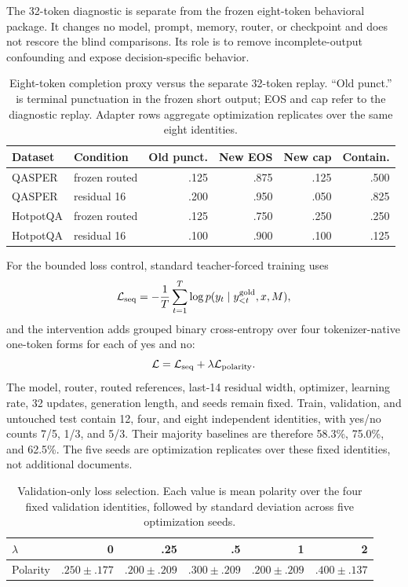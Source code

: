 \documentclass[11pt]{article}
\begin{document}
The 32-token diagnostic is separate from the frozen eight-token behavioral package. It changes no
model, prompt, memory, router, or checkpoint and does not rescore the blind comparisons. Its role is
to remove incomplete-output confounding and expose decision-specific behavior.

\begin{table}[H]
\centering
\small
\caption{Eight-token completion proxy versus the separate 32-token replay. ``Old punct.'' is
terminal punctuation in the frozen short output; EOS and cap refer to the diagnostic replay.
Adapter rows aggregate optimization replicates over the same eight identities.}
\label{tab:qasper-finish-diagnostic}
\begin{tabular}{llrrrr}
\toprule
Dataset & Condition & Old punct. & New EOS & New cap & Contain. \\
\midrule
QASPER & frozen routed & .125 & .875 & .125 & .500 \\
QASPER & residual 16 & .200 & .950 & .050 & .825 \\
HotpotQA & frozen routed & .125 & .750 & .250 & .250 \\
HotpotQA & residual 16 & .100 & .900 & .100 & .125 \\
\bottomrule
\end{tabular}
\end{table}

For the bounded loss control, standard teacher-forced training uses
\begin{equation}
  \mathcal{L}_{\rm seq}
  = -\frac{1}{T}\sum_{t=1}^{T}\log p(y_t\mid y_{<t}^{\rm gold},x,M),
\end{equation}
and the intervention adds grouped binary cross-entropy over four tokenizer-native one-token forms
for each of yes and no:
\begin{equation}
  \mathcal{L}=\mathcal{L}_{\rm seq}+\lambda\mathcal{L}_{\rm polarity}.
\end{equation}
The model, router, routed references, last-14 residual width, optimizer, learning rate, 32 updates,
generation length, and seeds remain fixed. Train, validation, and untouched test contain 12, four,
and eight independent identities, with yes/no counts 7/5, 1/3, and 5/3. Their majority baselines
are therefore 58.3\%, 75.0\%, and 62.5\%. The five seeds are optimization replicates over these
fixed identities, not additional documents.

\begin{table}[H]
\centering
\small
\caption{Validation-only loss selection. Each value is mean polarity over the four fixed
validation identities, followed by standard deviation across five optimization seeds.}
\label{tab:decision-aware-validation}
\begin{tabular}{lrrrrr}
\toprule
$\lambda$ & 0 & .25 & .5 & 1 & 2 \\
\midrule
Polarity & $.250\pm.177$ & $.200\pm.209$ & $.300\pm.209$ & $.200\pm.209$ & $\mathbf{.400\pm.137}$ \\
\bottomrule
\end{tabular}
\end{table}
\end{document}
